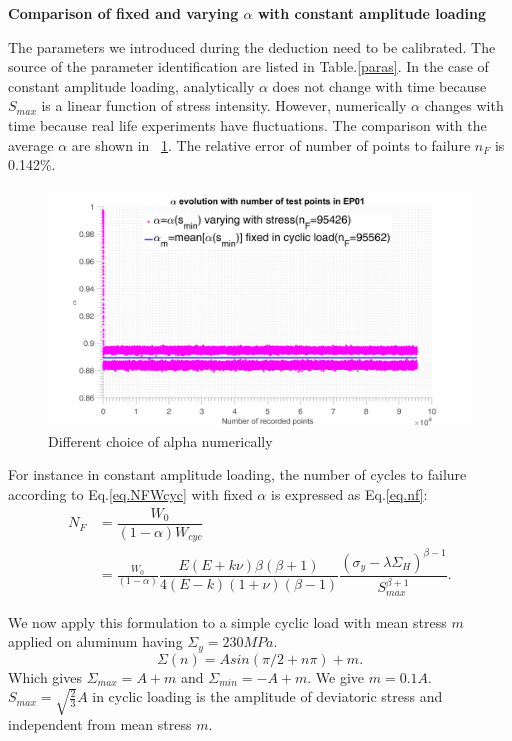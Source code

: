 \documentclass[3p,times,number,review]{elsarticle}
\newcommand{\figref}[1]{\figurename~\ref{#1}}
\begin{document}
\textbf{Comparison of fixed and varying $\alpha$ with constant amplitude loading}

The parameters we introduced during the deduction need to be calibrated. The source of the parameter identification are listed in Table.\ref{paras}.
In the case of constant amplitude loading, analytically $\alpha$ does not change with time because $S_{max}$ is a linear function of stress intensity. However, numerically $\alpha$ changes with time because real life experiments have fluctuations. The comparison with the average $\alpha$ are shown in \figref{fig:alpha}. The relative error of number of points to failure $n_F$ is 0.142\%.

\begin{figure}[!h]
	\centering
	\includegraphics[width=\textwidth]{figures//alpha_fix_vs_change.png} 
	\caption{Different choice of alpha numerically}
	\label{fig:alpha}
\end{figure}

For instance in constant amplitude loading, the number of cycles to failure according to Eq.\eqref{eq.NFWcyc} with fixed $\alpha$ is expressed as Eq.\eqref{eq.nf}:
\begin{equation}
\begin{split}
N_F&=\dfrac{W_0}{\left( 1-\alpha\right)W_{cyc} }
\\&= \frac{W_0}{\left( 1-\alpha\right) }\dfrac{E(E+k\nu)\beta\left( \beta+1\right) }{ 4(E-k)(1+\nu)\left( \beta-1\right) }\dfrac{\left(\sigma_y-\lambda \Sigma_H\right)^{\beta-1}}{S_{max}^{\beta+1} }  .
\end{split}
\label{eq.nf}
\end{equation}


We now apply this formulation to a simple cyclic load with mean stress $m$ applied on aluminum having $\Sigma_y=230MPa$.
$$\Sigma(n)=Asin(\pi/2+n\pi)+m.$$
Which gives $\Sigma_{max}=A+m$ and $\Sigma_{min}=-A+m$. We give $m=0.1A$. $S_{max}=\sqrt{\frac{2}{3}}A$ in cyclic loading is the amplitude of deviatoric stress and independent from mean stress $m$.
\end{document}
